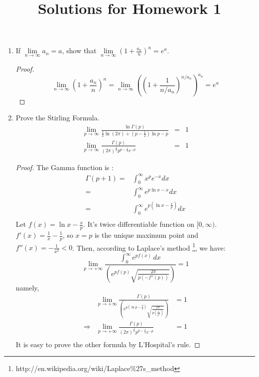 \documentclass[10pt,a4paper]{article}
\title{Solutions for Homework 1}
\date{}
\begin{document}
\maketitle
\begin{enumerate}
\item
If $\lim \limits_{n\rightarrow\infty}a_n=a$, show that $\lim \limits_{n\rightarrow\infty}\left(1+\frac{a_n}{n}\right)^n=e^{a}$.
\begin{proof}
$$\lim \limits_{n\rightarrow\infty}\left(1+\frac{a_n}{n}\right)^n  = \lim \limits_{n\rightarrow\infty}\left(\left(1+\frac{1}{n/a_n}\right)^{n/a_n}\right)^{a_n} = e^a$$
\end{proof}

\item
Prove the Stirling Formula.
\begin{eqnarray*}
\lim_{p\rightarrow\infty}\frac{\ln\Gamma(p)}{\frac{1}{2}\ln(2\pi)+(p-\frac{1}{2})\ln{p}-p}&=&1\\
\lim_{p\rightarrow\infty}\frac{\Gamma(p)}{(2\pi)^{\frac{1}{2}}p^{p-\frac{1}{2}}e^{-p}}&=&1
\end{eqnarray*}
\begin{proof}
The Gamma function is :
\begin{eqnarray*}
\Gamma(p+1)  = &\int_0^{\infty}x^pe^{-x}dx \\
= &\int_0^{\infty}e^{p\ln x-x}dx \\
= &\int_0^{\infty}e^{p(\ln x-\frac{x}{p})}dx \\
\end{eqnarray*}
Let $f(x) = \ln x-\frac{x}{p}$. It's twice differentiable function on $[0,\infty)$.
$f'(x) = \frac{1}{x}-\frac{1}{p}$, so $x=p$ is the unique maximum point and $f''(x) = -\frac{1}{x^2}<0$. Then, according to Laplace's method \footnote{http://en.wikipedia.org/wiki/Laplace\%27s\_method}, we have:
$$\lim_{p \to +\infty}  \frac{\int_0^\infty e^{pf(x)} \, dx}{\left( e^{pf(p)}\sqrt{\frac{2 \pi}{p (-f''(p))}} \right)} =1 $$
namely,
\begin{eqnarray*}
& \lim\limits_{ p \to +\infty}  \frac{\Gamma(p)}{\left( e^{p(\ln p-\frac{p}{p})}\sqrt{\frac{2 \pi}{p (\frac{1}{p^2})}} \right)}  &= 1 \\
\Longrightarrow & \lim\limits_{p \to +\infty}  \frac{\Gamma(p)}{(2\pi)^{\frac{1}{2}}p^{p-\frac{1}{2}}e^{-p}} &= 1 \\
\end{eqnarray*}
It is easy to prove the other formula by L'Hospital's rule.
\end{proof}


\end{enumerate}
\end{document}
